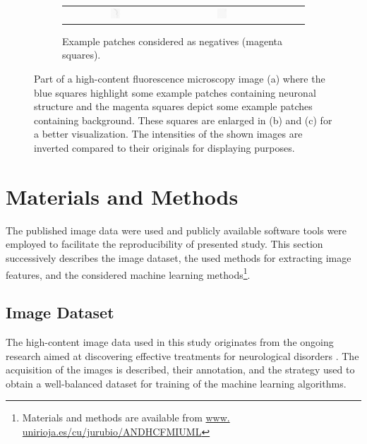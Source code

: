 \begin{figure}
\begin{subfigure}{\textwidth}
\begin{tabular}{c@{\,}c@{\,}c@{\,}c@{\,}c@{}}
			\includegraphics[width=0.1\textwidth]{fig01c14} &
			\includegraphics[width=0.1\textwidth]{fig01c15}
		\end{tabular}
		\vspace{-0.5em}
		\caption{Example patches considered as negatives (magenta squares).}
	\end{subfigure}	
	\caption{Part of a high-content fluorescence microscopy image (a) where the blue squares highlight some example patches containing neuronal structure and the magenta squares depict some example patches containing background. These squares are enlarged in (b) and (c) for a better visualization. The intensities of the shown images are inverted compared to their originals for displaying purposes.}
	\label{fig1}
\end{figure}
\section{Materials and Methods}
\label{sec:matmet}
The published image data were used and publicly available software tools were employed to facilitate the reproducibility of presented study. This section successively describes the image dataset, the used methods for extracting image features, and the considered machine learning methods\footnote{Materials and methods are available from \url{www. unirioja.es/cu/jurubio/ANDHCFMIUML}}.

\subsection{Image Dataset}
\label{sec:data}

The high-content image data used in this study originates from the ongoing research aimed at discovering effective treatments for neurological disorders \cite{cuesto2011phosphoinositide, enriquez2014learning, enriquez2016pi3k}. The acquisition of the images is described, their annotation, and the strategy used to obtain a well-balanced dataset for training of the machine learning algorithms.

